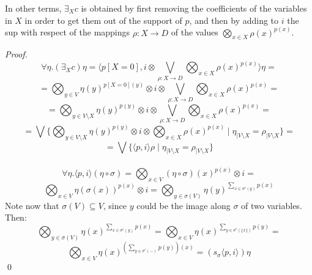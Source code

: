 \documentclass{llncs}
\begin{document}
In other terms, $\exists_X c$ is obtained by first removing the coefficients of the variables in $X$
in order to get them out of the support of $p$, and then by adding to $i$ the sup with respect of the 
mappings $\rho: X \rightarrow D$ of the values $\bigotimes_{x \in X} \rho(x)^{p(x)}$.

\begin{proof}
\[ \forall \eta. (\exists_X c)\eta = \langle p[X = 0], i \otimes \bigvee_{\rho: X \rightarrow D} \bigotimes_{x \in X} \rho(x)^{p(x)} \rangle \eta = \]
\[ = \bigotimes_{y \in V} \eta(y)^{p[X = 0](y)} \otimes i \otimes \bigvee_{\rho: X \rightarrow D} \bigotimes_{x \in X} \rho(x)^{p(x)} = \]
\[ = \bigotimes_{y \in V \setminus X} \eta(y)^{p(y)} \otimes i \otimes \bigvee_{\rho: X \rightarrow D} \bigotimes_{x \in X} \rho(x)^{p(x)} = \]
\[ = \bigvee \{ \bigotimes_{y \in V \setminus X} \eta(y)^{p(y)} \otimes i \otimes \bigotimes_{x \in X} \rho(x)^{p(x)} \mid \eta_{\mid V \setminus X} = \rho_{\mid V \setminus X} \} = \]
\[ = \bigvee \{ \langle p, i \rangle \rho \mid \eta_{\mid V \setminus X} = \rho_{\mid V \setminus X} \} \]
\\
\[ \forall \eta. \langle p, i \rangle (\eta \circ \sigma) = \bigotimes_{x \in V} (\eta \circ \sigma)(x)^{p(x)} \otimes i = \]
\[ \bigotimes_{x \in V} \eta(\sigma(x))^{p(x)} \otimes i = \bigotimes_{y \in \sigma(V)} \eta(y)^{\sum_{x \in \sigma^c(y)} p(x)} \]
Note now that $\sigma(V) \subseteq V$, since $y$ could be the image along $\sigma$ of two variables. Then:
\[ \bigotimes_{y \in \sigma(V)} \eta(x)^{\sum_{x \in \sigma^c(y)} p(x)} = \bigotimes_{x \in V} \eta(x)^{\sum_{y \in \sigma^c(\{x\})} p(y)} = \]
\[ \bigotimes_{x \in V} \eta(x)^{(\sum_{y \in \sigma^c(-)} p(y))(x)} = (s_\sigma \langle p, i \rangle) \eta \]
\qed
\end{proof}
\end{document}
